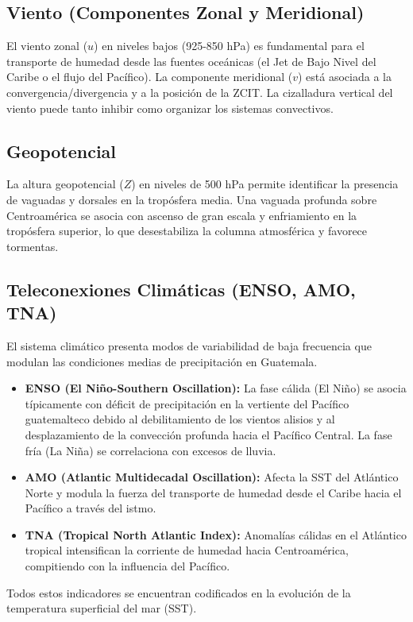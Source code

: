 \subsection{Viento (Componentes Zonal y Meridional)}
El viento zonal (\(u\)) en niveles bajos (925-850 hPa) es fundamental para el transporte de humedad desde las fuentes oceánicas (el Jet de Bajo Nivel del Caribe o el flujo del Pacífico). La componente meridional (\(v\)) está asociada a la convergencia/divergencia y a la posición de la ZCIT. La cizalladura vertical del viento puede tanto inhibir como organizar los sistemas convectivos.

\subsection{Geopotencial}
La altura geopotencial (\(Z\)) en niveles de 500 hPa permite identificar la presencia de vaguadas y dorsales en la tropósfera media. Una vaguada profunda sobre Centroamérica se asocia con ascenso de gran escala y enfriamiento en la tropósfera superior, lo que desestabiliza la columna atmosférica y favorece tormentas.

\subsection{Teleconexiones Climáticas (ENSO, AMO, TNA)}
El sistema climático presenta modos de variabilidad de baja frecuencia que modulan las condiciones medias de precipitación en Guatemala.
\begin{itemize}
    \item \textbf{ENSO (El Niño-Southern Oscillation):} La fase cálida (El Niño) se asocia típicamente con déficit de precipitación en la vertiente del Pacífico guatemalteco debido al debilitamiento de los vientos alisios y al desplazamiento de la convección profunda hacia el Pacífico Central. La fase fría (La Niña) se correlaciona con excesos de lluvia.
    \item \textbf{AMO (Atlantic Multidecadal Oscillation):} Afecta la SST del Atlántico Norte y modula la fuerza del transporte de humedad desde el Caribe hacia el Pacífico a través del istmo.
    \item \textbf{TNA (Tropical North Atlantic Index):} Anomalías cálidas en el Atlántico tropical intensifican la corriente de humedad hacia Centroamérica, compitiendo con la influencia del Pacífico.
\end{itemize}

Todos estos indicadores se encuentran codificados en la evolución de la temperatura superficial del mar (SST).

